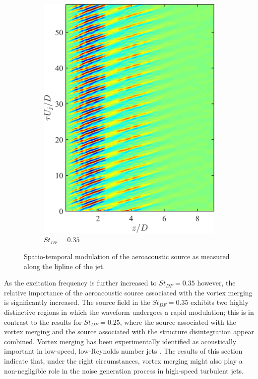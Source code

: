 \begin{figure}
\begin{subfigure}{0.33\textwidth}
		\includegraphics[width=0.95\linewidth]{Figures/ch5_St035_modulated_source.png}
		\caption{$St_{DF} = 0.35$}
	\end{subfigure}
	\caption{Spatio-temporal modulation of the aeroacoustic source as measured along the lipline of the jet.}
	\label{fig:jittering}
\end{figure}

As the excitation frequency is further increased to $St_{DF} = 0.35$ however, the relative importance of the aeroacoustic source associated with the vortex merging is significantly increased.
The source field in the $St_{DF} = 0.35$ exhibits two highly distinctive regions in which the waveform undergoes a rapid modulation; this is in contrast to the results for $St_{DF} = 0.25$, where the source associated with the vortex merging and the source associated with the structure disintegration appear combined.
Vortex merging has been experimentally identified as acoustically important in low-speed, low-Reynolds number jets \citep{Kibens1980}.
The results of this section indicate that, under the right circumstances, vortex merging might also play a non-negligible role in the noise generation process in high-speed turbulent jets.